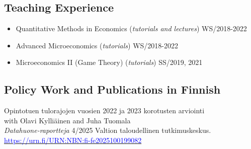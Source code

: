 \documentclass[16pt]{article}
\begin{document}
\subsection*{Teaching Experience}
\begin{itemize} \setlength\itemsep{0.01em}
                          \item Quantitative Methods in Economics (\textit{tutorials and lectures}) WS/2018-2022  
                          \item Advanced Microeconomics (\textit{tutorials}) WS/2018-2022 
                          \item Microeconomics II (Game Theory) (\textit{tutorials}) SS/2019, 2021 
\end{itemize}








\subsection*{Policy Work and Publications in Finnish}


\noindent Opintotuen tulorajojen vuosien 2022 ja 2023 korotusten arviointi \\
\noindent with Olavi Kylliäinen and Juha Tuomala \\
\noindent \textit{Datahuone-raportteja} 4/2025 Valtion taloudellinen tutkimuskeskus. \\
\noindent \href{https://urn.fi/URN:NBN:fi-fe2025100199082}{\textcolor{blue}{https://urn.fi/URN:NBN:fi-fe2025100199082}} \\
\end{document}
